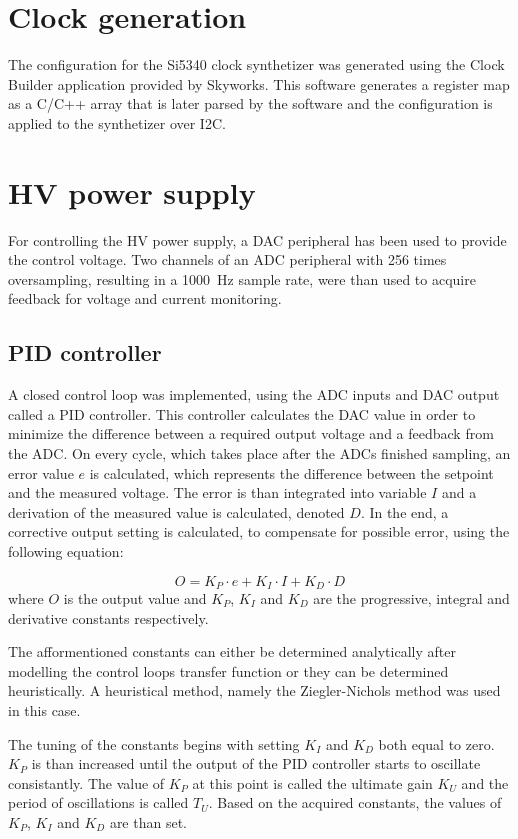 \section{Clock generation}
The configuration for the Si5340 clock synthetizer was generated using the Clock Builder application provided by Skyworks. This software generates a register map as a C/C++ array that is later parsed by the software and the configuration is applied to the synthetizer over I2C.

\section{HV power supply}
For controlling the HV power supply, a DAC peripheral has been used to provide the control voltage. Two channels of an ADC peripheral with 256 times oversampling, resulting in a \SI{1000}{\hertz} sample rate, were than used to acquire feedback for voltage and current monitoring. 

\subsection{PID controller}
A closed control loop was implemented, using the ADC inputs and DAC output called a PID controller. This controller calculates the DAC value in order to minimize the difference between a required output voltage and a feedback from the ADC. On every cycle, which takes place after the ADCs finished sampling, an error value $e$ is calculated, which represents the difference between the setpoint and the measured voltage. The error is than integrated into variable $I$ and a derivation of the measured value is calculated, denoted $D$. In the end, a corrective output setting is calculated, to compensate for possible error, using the following equation:

\begin{equation}
    O = K_P \cdot e + K_I \cdot I + K_D \cdot D
\end{equation}
where $O$ is the output value and $K_P$, $K_I$ and $K_D$ are the progressive, integral and derivative constants respectively.

The afformentioned constants can either be determined analytically after modelling the control loops transfer function or they can be determined heuristically. A heuristical method, namely the Ziegler-Nichols method was used in this case.

The tuning of the constants begins with setting $K_I$ and $K_D$ both equal to zero. $K_P$ is than increased until the output of the PID controller starts to oscillate consistantly. The value of $K_P$ at this point is called the ultimate gain $K_U$ and the period of oscillations is called $T_U$. Based on the acquired constants, the values of $K_P$, $K_I$ and $K_D$ are than set.

